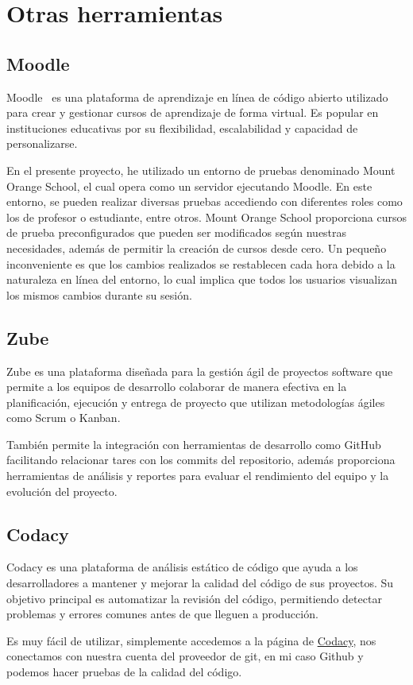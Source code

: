 \section{Otras herramientas}

\subsection{Moodle}

Moodle~\cite{moodle} es una plataforma de aprendizaje en línea de código abierto utilizado para crear y gestionar cursos de aprendizaje de forma virtual. Es popular en instituciones educativas por su flexibilidad, escalabilidad y capacidad de personalizarse.

En el presente proyecto, he utilizado un entorno de pruebas denominado Mount Orange School, el cual opera como un servidor ejecutando Moodle. En este entorno, se pueden realizar diversas pruebas accediendo con diferentes roles como los de profesor o estudiante, entre otros. Mount Orange School proporciona cursos de prueba preconfigurados que pueden ser modificados según nuestras necesidades, además de permitir la creación de cursos desde cero. Un pequeño inconveniente es que los cambios realizados se restablecen cada hora debido a la naturaleza en línea del entorno, lo cual implica que todos los usuarios visualizan los mismos cambios durante su sesión.

\subsection{Zube}

Zube es una plataforma diseñada para la gestión ágil de proyectos software que permite a los equipos de desarrollo colaborar de manera efectiva en la planificación, ejecución y entrega de proyecto que utilizan metodologías ágiles como Scrum o Kanban.

También permite la integración con herramientas de desarrollo como GitHub facilitando relacionar tares con los commits del repositorio, además proporciona herramientas de análisis y reportes para evaluar el rendimiento del equipo y la evolución del proyecto.

\subsection{Codacy}

Codacy es una plataforma de análisis estático de código que ayuda a los desarrolladores a mantener y mejorar la calidad del código de sus proyectos. Su objetivo principal es automatizar la revisión del código, permitiendo detectar problemas y errores comunes antes de que lleguen a producción.

Es muy fácil de utilizar, simplemente accedemos a la página de \href{https://www.codacy.com/}{Codacy}, nos conectamos con nuestra cuenta del proveedor de git, en mi caso Github y podemos hacer pruebas de la calidad del código.